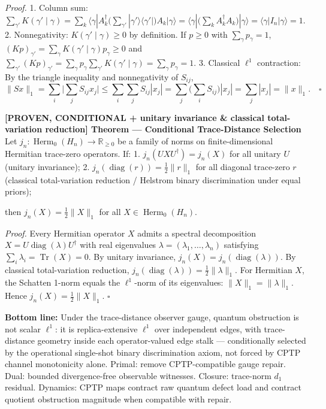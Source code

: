 \documentclass[
  11pt,
]{article}
\renewenvironment{quote}
  {\begin{leftbar}\small}
  {\end{leftbar}}
\begin{document}
\begin{quote}
\emph{Proof.}
1. Column sum: \(\sum_{\gamma'} K(\gamma'\mid\gamma) = \sum_k \langle\gamma|A_k^\dagger \Big(\sum_{\gamma'} |\gamma'\rangle\langle\gamma'|\Big) A_k|\gamma\rangle = \langle\gamma|\Big(\sum_k A_k^\dagger A_k\Big)|\gamma\rangle = \langle\gamma|I_n|\gamma\rangle = 1\).
2. Nonnegativity: \(K(\gamma'\mid\gamma) \ge 0\) by definition. If \(p \ge 0\) with \(\sum_\gamma p_\gamma = 1\), \((Kp)_{\gamma'} = \sum_\gamma K(\gamma'\mid\gamma) p_\gamma \ge 0\) and \(\sum_{\gamma'} (Kp)_{\gamma'} = \sum_\gamma p_\gamma \sum_{\gamma'} K(\gamma'\mid\gamma) = \sum_\gamma p_\gamma = 1\).
3. Classical \(\ell^1\) contraction: By the triangle inequality and nonnegativity of \(S_{ij}\),
\[\|Sx\|_1 = \sum_i \Big|\sum_j S_{ij} x_j\Big| \le \sum_i \sum_j S_{ij} |x_j| = \sum_j \Big(\sum_i S_{ij}\Big) |x_j| = \sum_j |x_j| = \|x\|_1. \quad \square\]

\textbf{{[}PROVEN, CONDITIONAL + unitary invariance \& classical total-variation reduction{]} Theorem --- Conditional Trace-Distance Selection}
Let \(j_n: \operatorname{Herm}_0(H_n) \to \mathbb{R}_{\ge 0}\) be a family of norms on finite-dimensional Hermitian trace-zero operators. If:
1. \(j_n(U X U^\dagger) = j_n(X)\) for all unitary \(U\) (unitary invariance);
2. \(j_n(\operatorname{diag}(r)) = \frac{1}{2}\|r\|_1\) for all diagonal trace-zero \(r\) (classical total-variation reduction / Helstrom binary discrimination under equal priors);

then \(j_n(X) = \frac{1}{2}\|X\|_1\) for all \(X \in \operatorname{Herm}_0(H_n)\).

\emph{Proof.}
Every Hermitian operator \(X\) admits a spectral decomposition \(X = U \operatorname{diag}(\lambda) U^\dagger\) with real eigenvalues \(\lambda = (\lambda_1, \ldots, \lambda_n)\) satisfying \(\sum_i \lambda_i = \operatorname{Tr}(X) = 0\). By unitary invariance, \(j_n(X) = j_n(\operatorname{diag}(\lambda))\). By classical total-variation reduction, \(j_n(\operatorname{diag}(\lambda)) = \frac{1}{2}\|\lambda\|_1\). For Hermitian \(X\), the Schatten 1-norm equals the \(\ell^1\)-norm of its eigenvalues: \(\|X\|_1 = \|\lambda\|_1\). Hence \(j_n(X) = \frac{1}{2}\|X\|_1\). \(\square\)

\textbf{Bottom line:} Under the trace-distance observer gauge, quantum obstruction is not scalar \(\ell^1\): it is replica-extensive \(\ell^1\) over independent edges, with trace-distance geometry inside each operator-valued edge stalk --- conditionally selected by the operational single-shot binary discrimination axiom, not forced by CPTP channel monotonicity alone. Primal: remove CPTP-compatible gauge repair. Dual: bounded divergence-free observable witnesses. Closure: trace-norm \(d_1\) residual. Dynamics: CPTP maps contract raw quantum defect load and contract quotient obstruction magnitude when compatible with repair.
\end{quote}
\end{document}

